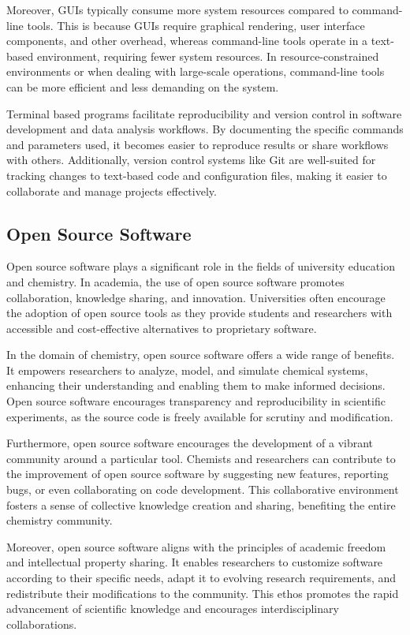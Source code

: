 \documentclass[../Master.tex]{subfiles}
\begin{document}
Moreover, GUIs typically consume more system resources compared to command-line tools. This is because GUIs require graphical rendering, user interface components, and other overhead, whereas command-line tools operate in a text-based environment, requiring fewer system resources. In resource-constrained environments or when dealing with large-scale operations, command-line tools can be more efficient and less demanding on the system.

Terminal based programs facilitate reproducibility and version control in software development and data analysis workflows. By documenting the specific commands and parameters used, it becomes easier to reproduce results or share workflows with others. Additionally, version control systems like Git are well-suited for tracking changes to text-based code and configuration files, making it easier to collaborate and manage projects effectively.

\subsection{Open Source Software}\label{sec:open-source-software}

Open source software plays a significant role in the fields of university education and chemistry. In academia, the use of open source software promotes collaboration, knowledge sharing, and innovation. Universities often encourage the adoption of open source tools as they provide students and researchers with accessible and cost-effective alternatives to proprietary software.

In the domain of chemistry, open source software offers a wide range of benefits. It empowers researchers to analyze, model, and simulate chemical systems, enhancing their understanding and enabling them to make informed decisions. Open source software encourages transparency and reproducibility in scientific experiments, as the source code is freely available for scrutiny and modification.

Furthermore, open source software encourages the development of a vibrant community around a particular tool. Chemists and researchers can contribute to the improvement of open source software by suggesting new features, reporting bugs, or even collaborating on code development. This collaborative environment fosters a sense of collective knowledge creation and sharing, benefiting the entire chemistry community.

Moreover, open source software aligns with the principles of academic freedom and intellectual property sharing. It enables researchers to customize software according to their specific needs, adapt it to evolving research requirements, and redistribute their modifications to the community. This ethos promotes the rapid advancement of scientific knowledge and encourages interdisciplinary collaborations.
\end{document}
